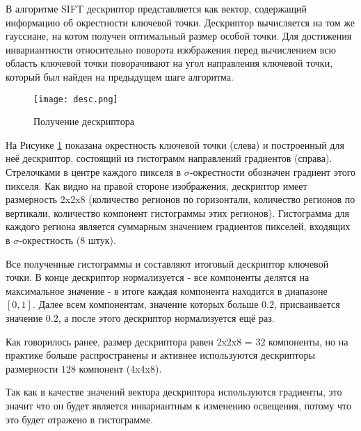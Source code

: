 В алгоритме SIFT дескриптор представляется как вектор, содержащий информацию об окрестности ключевой точки. Дескриптор вычисляется на том же гауссиане, на котом получен оптимальный размер особой точки. Для достижения инвариантности относительно поворота изображения перед вычислением всю область ключевой точки поворачивают на угол направления ключевой точки, который был найден на предыдущем шаге алгоритма.

\begin{figure}[h]
    \centering
    \texttt{[image: desc.png]}
    \caption{Получение дескриптора}
    \label{fig:desc}
\end{figure}

На Рисунке \ref{fig:desc} показана окрестность ключевой точки (слева) и построенный для неё дескриптор, состоящий из гистограмм направлений градиентов (справа). Стрелочками в центре каждого пикселя в $\sigma$-окрестности обозначен градиент этого пикселя. Как видно на правой стороне изображения, дескриптор имеет размерность 2x2x8 (количество регионов по горизонтали, количество регионов по вертикали, количество компонент гистограммы этих регионов). Гистограмма для каждого региона является суммарным значением градиентов пикселей, входящих в $\sigma$-окрестность ($8$ штук).

Все полученные гистограммы и составляют итоговый дескриптор ключевой точки. В конце дескриптор нормализуется - все компоненты делятся на максимальное значение - в итоге каждая компонента находится в диапазоне $[0,1]$. Далее всем компонентам, значение которых больше $0.2$, присваивается значение $0.2$, а после этого дескриптор нормализуется ещё раз.

Как говорилось ранее, размер дескриптора равен 2x2x8 = $32$ компоненты, но на практике больше распространены и активнее используются дескрипторы размерности $128$ компонент (4x4x8).

Так как в качестве значений вектора дескриптора используются градиенты, это значит что он будет является инвариантным к изменению освещения, потому что это будет отражено в гистограмме.